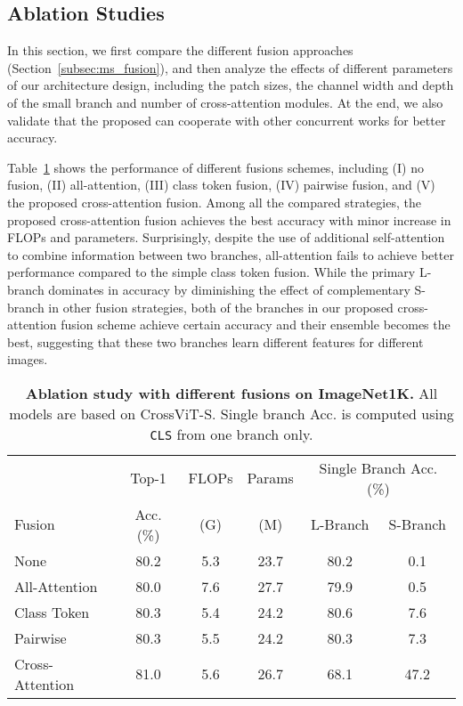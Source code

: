 \documentclass[10pt,twocolumn,letterpaper]{article}
\def\clstoken{\texttt{CLS}\xspace}
\def\ours{CrossViT\xspace}
\newcommand{\myparagraph}[1]{\vspace{1mm} \noindent {\textbf{#1}}}
\begin{document}
 \subsection{Ablation Studies}
\label{subsec:ablations}
In this section, we first compare the different fusion approaches (Section~\ref{subsec:ms_fusion}), and then analyze the effects of different parameters of our architecture design, including the patch sizes, the channel width and depth of the small branch and number of cross-attention modules. At the end, we also validate that the proposed can cooperate with other concurrent works for better accuracy.



\myparagraph{Comparison of Different Fusion Schemes.} Table~\ref{table:ablation_fusion} shows the performance of different fusions schemes, including (I) no fusion, (II) all-attention, (III) class token fusion, (IV) pairwise fusion, and (V) the proposed cross-attention fusion. Among all the compared strategies, the proposed cross-attention fusion achieves the best accuracy with minor increase in FLOPs and parameters. Surprisingly, despite the use of additional self-attention to combine information between two branches, all-attention fails to achieve better performance compared to the simple class token fusion. While the primary L-branch dominates in accuracy by diminishing the effect of complementary S-branch in other fusion strategies, both of the branches in our proposed cross-attention fusion scheme achieve certain accuracy and their ensemble becomes the best, suggesting that these two branches learn different features for different images.  



\begin{table}[t]
    \centering
    \begin{adjustbox}{max width=\linewidth}
    \begin{tabular}{l|c|c|c||c|c}
        \toprule
               & Top-1 & FLOPs & Params & \multicolumn{2}{c}{Single Branch Acc. (\%) } \\ 
        Fusion & Acc. (\%)  & (G) & (M) & L-Branch & S-Branch \\
        \midrule
            None & 80.2 & 5.3 & 23.7 & 80.2 & 0.1 \\
            All-Attention & 80.0 &  7.6 & 27.7 & 79.9 & 0.5 \\
            Class Token & 80.3 & 5.4 & 24.2 & 80.6 & 7.6 \\
            Pairwise & 80.3 & 5.5 & 24.2 & 80.3 & 7.3 \\ 
            Cross-Attention & 81.0 & 5.6 & 26.7 & 68.1 & 47.2 \\
        \bottomrule
    \end{tabular}
    \end{adjustbox}
\caption{\textbf{Ablation study with different fusions on ImageNet1K.} All models are based on \ours-S. Single branch Acc. is computed using \clstoken from one branch only.}
    \label{table:ablation_fusion}
\end{table}
\end{document}
